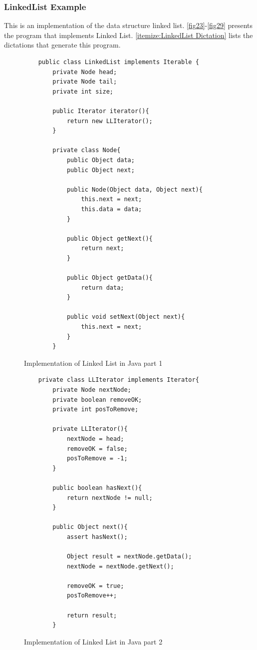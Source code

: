 \subsubsection{LinkedList Example}
This is an implementation of the data structure linked list. \autoref{fig23}-\autoref{fig29} presents the program that implements Linked List. \autoref{itemize:LinkedList Dictation} lists the dictations that generate this program.
\begin{figure}[H]
	\begin{lstlisting}
	public class LinkedList implements Iterable {
		private Node head;
		private Node tail;
		private int size;
		
		public Iterator iterator(){
			return new LLIterator();
		}
		
		private class Node{
			public Object data;
			public Object next;
			
			public Node(Object data, Object next){
				this.next = next;
				this.data = data;
			}
			
			public Object getNext(){
				return next;
			}
			
			public Object getData(){
				return data;
			}
			
			public void setNext(Object next){
				this.next = next;
			}
		}
	\end{lstlisting}
	\caption{Implementation of Linked List in Java part 1}
	\label{fig23}
\end{figure}
\begin{figure}[H]
	\begin{lstlisting}
	private class LLIterator implements Iterator{
		private Node nextNode;
		private boolean removeOK;
		private int posToRemove;
		
		private LLIterator(){
			nextNode = head;
			removeOK = false;
			posToRemove = -1;
		}
		
		public boolean hasNext(){
			return nextNode != null;
		}
		
		public Object next(){
			assert hasNext();
			
			Object result = nextNode.getData();
			nextNode = nextNode.getNext();
			
			removeOK = true;
			posToRemove++;
			
			return result;
		}
	\end{lstlisting}
	\caption{Implementation of Linked List in Java part 2}
	\label{fig24}
\end{figure}
